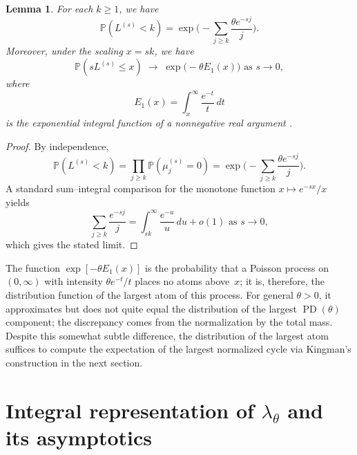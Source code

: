 \documentclass{amsart}
\newtheorem{lemma}[theorem]{Lemma}
\theoremstyle{definition}
\theoremstyle{remark}
\numberwithin{equation}{section}
\DeclareMathOperator{\PD}{PD}
\begin{document}
\begin{lemma}
\label{lemma:largest}
For each $k \ge 1$, we have
\begin{equation}
\mathbb{P}(L^{(s)} < k)
= \exp\biggl(-\sum_{j \ge k} \frac{\theta e^{-sj}}{j}\biggr).
\end{equation}
Moreover, under the scaling $x = sk$, we have
\begin{equation}
\mathbb{P}(s L^{(s)} \le x)
\;\longrightarrow\;
\exp\bigl(-\theta E_{1}(x)\bigr) \text{ as } s \to 0,
\end{equation}
where
\begin{equation}
 E_{1}(x) = \int_{x}^{\infty} \frac{e^{-t}}{t}\,dt
\end{equation}
is the exponential integral function of a nonnegative real argument \cite[{\S}15.09]{Jeffreys1972}.
\end{lemma}
%
\begin{proof}
By independence,
\begin{equation}
\mathbb{P}(L^{(s)} < k)
= \prod_{j \ge k} \mathbb{P}(\mu_{j}^{(s)} = 0)
= \exp\biggl(-\sum_{j\ge k} \frac{\theta e^{-s j}}{j}\biggr).
\end{equation}
A standard sum--integral comparison for the monotone function $x \mapsto e^{-s x}/x$ yields
\begin{equation}
\sum_{j\ge k} \frac{e^{-s j}}{j}
= \int_{s k}^\infty \frac{e^{-u}}{u}\,du + o(1) \text{ as } s \to 0,
\end{equation}
which gives the stated limit.
\end{proof}

The function $\exp[-\theta E_{1}(x)]$ is the probability that a Poisson process on $(0,\infty)$ with intensity $\theta e^{-t}/t$ places no atoms above~$x$; it is, therefore, the distribution function of the largest atom of this process. For general $\theta > 0$, it approximates but does not quite equal the distribution of the largest $\PD(\theta)$ component; the discrepancy comes from the normalization by the total mass. Despite this somewhat subtle difference, the distribution of the largest atom suffices to compute the expectation of the largest normalized cycle via Kingman's construction in the next section.


\section{Integral representation of $\lambda_{\theta}$ and its asymptotics}
\label{sec:lambda}
\end{document}
